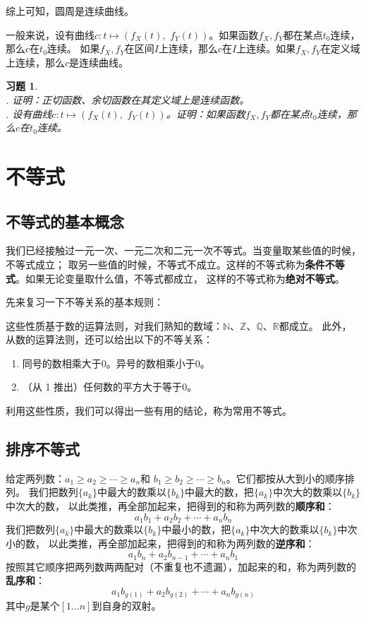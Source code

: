 \documentclass[12pt,UTF8]{ctexbook}
\newtheorem{xt}{习题}[section]
\begin{document}
综上可知，圆周是连续曲线。

一般来说，设有曲线$c: t\mapsto (f_X(t), \,\, f_Y(t))$。如果函数$f_X, f_Y$都在某点$t_0$连续，那么$c$在$t_0$连续。
如果$f_X, f_Y$在区间$I$上连续，那么$c$在$I$上连续。如果$f_X, f_Y$在定义域上连续，那么$c$是连续曲线。

\begin{xt}
    \mbox{} \\
    . 证明：正切函数、余切函数在其定义域上是连续函数。\\
    . 设有曲线$c: t\mapsto (f_X(t), \,\, f_Y(t))$。证明：如果函数$f_X, f_Y$都在某点$t_0$连续，那么$c$在$t_0$连续。
\end{xt}

\chapter{不等式}

\section{不等式的基本概念}

我们已经接触过一元一次、一元二次和二元一次不等式。当变量取某些值的时候，不等式成立；
取另一些值的时候，不等式不成立。这样的不等式称为\textbf{条件不等式}。如果无论变量取什么值，不等式都成立，
这样的不等式称为\textbf{绝对不等式}。

先来复习一下不等关系的基本规则：

这些性质基于数的运算法则，对我们熟知的数域：$\mathbb{N}$、$\mathbb{Z}$、$\mathbb{Q}$、$\mathbb{R}$都成立。
此外，从数的运算法则，还可以给出以下的不等关系：
\begin{enumerate}
    \item 同号的数相乘大于$0$。异号的数相乘小于$0$。
    \item （从 1 推出）任何数的平方大于等于$0$。
\end{enumerate}

利用这些性质，我们可以得出一些有用的结论，称为常用不等式。

\section{排序不等式}

给定两列数：$a_1 \geqslant a_2 \geqslant \cdots \geqslant a_n$和
$b_1 \geqslant b_2 \geqslant \cdots \geqslant b_n$。它们都按从大到小的顺序排列。
我们把数列$\{a_k\}$中最大的数乘以$\{b_k\}$中最大的数，把$\{a_k\}$中次大的数乘以$\{b_k\}$中次大的数，
以此类推，再全部加起来，把得到的和称为两列数的\textbf{顺序和}：
$$ a_1b_1 + a_2b_2 + \cdots + a_nb_n $$
我们把数列$\{a_k\}$中最大的数乘以$\{b_k\}$中最小的数，把$\{a_k\}$中次大的数乘以$\{b_k\}$中次小的数，
以此类推，再全部加起来，把得到的和称为两列数的\textbf{逆序和}：
$$ a_1b_n + a_2b_{n-1} + \cdots + a_nb_1 $$
按照其它顺序把两列数两两配对（不重复也不遗漏），加起来的和，称为两列数的\textbf{乱序和}：
$$ a_1b_{g(1)} + a_2b_{g(2)} + \cdots + a_nb_{g(n)} $$
其中$g$是某个$[1\dots n]$到自身的双射。
\end{document}

